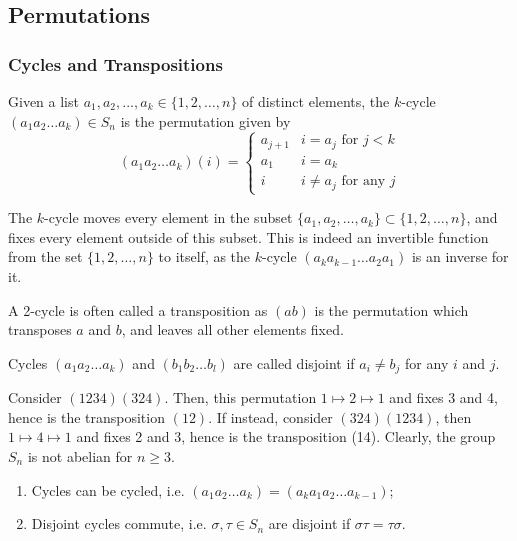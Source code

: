 \documentclass[a4paper]{article}
\begin{document}
\subsection{Permutations}
\subsubsection{Cycles and Transpositions}
\begin{defi}[Cycles]
Given a list $a_1,a_2,...,a_k\in\{1,2,\dots,n\}$ of distinct elements, the $k$-cycle $(a_1a_2\dots a_k)\in S_n$ is the permutation given by
$$(a_1a_2\dots a_k)(i)=
\left\{
        \begin{array}{ll}
      a_{j+1} & i=a_j\text{ for }j<k \\
      a_1 & i=a_k\\
      i & i\neq a_j\text{ for any }j
        \end{array}
    \right.$$
\end{defi}
The $k$-cycle moves every element in the subset $\{a_1,a_2,\dots,a_k\}\subset\{1,2,\dots,n\}$, and fixes every element outside of this subset. This is indeed an invertible function from the set $\{1,2,\dots,n\}$ to itself, as the $k$-cycle $(a_ka_{k-1}\dots a_2a_1)$ is an inverse for it.
\begin{defi}[Transposition]
A 2-cycle is often called a transposition as $(ab)$ is the permutation which transposes $a$ and $b$, and leaves all other elements fixed.
\end{defi}
\begin{defi}
Cycles $(a_1a_2\dots a_k)$ and $(b_1b_2\dots b_l)$ are called disjoint if $a_i\neq b_j$ for any $i$ and $j$.
\end{defi}
\begin{eg}
Consider $(1234)(324)$. Then, this permutation $1\mapsto2\mapsto1$ and fixes 3 and 4, hence is the transposition $(12)$. If instead, consider $(324)(1234)$, then $1\mapsto4\mapsto1$ and fixes 2 and 3, hence is the transposition (14). Clearly, the group $S_n$ is not abelian for $n\geq3$.
\end{eg}
\begin{lemma}\leavevmode
\begin{enumerate}
    \item Cycles can be cycled, i.e. $(a_1a_2\dots a_k)=(a_ka_1a_2\dots a_{k-1})$;
    \item Disjoint cycles commute, i.e. $\sigma,\tau\in S_n$ are disjoint if $\sigma\tau=\tau\sigma$.
\end{enumerate}
\end{lemma}
\end{document}

